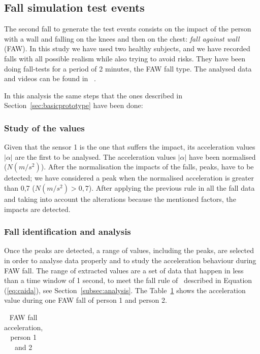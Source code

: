 \documentclass[review]{elsarticle}
\begin{document}
\subsection{Fall simulation test events}

The second fall to generate the test events consists on the impact of the person with 
a wall and falling on the knees and then on the chest: \textit{fall against wall} (FAW). 
In this study we have used two healthy subjects, and we have recorded falls with all 
possible realism while also trying to avoid risks. They have been doing fall-tests for a period 
of 2 minutes, the FAW fall type. The analysed data and videos can be found in ~\cite{FallRepo}.

In this analysis the same steps that the ones described in Section~\ref{sec:basicprototype} 
have been done:

\subsubsection*{Study of the values} Given that the sensor 1 is the one that suffers the 
impact, its acceleration values $|\alpha|$ are the first to be
analysed. The acceleration values $|\alpha|$ have 
been normalised ($N(m/s^2)$). After the normalisation the impacts of the falls, peaks, 
have to be detected; we have considered a peak when the normalised acceleration is 
greater than 0,7 ($N(m/s^2) > 0,7$). After applying the previous rule in all the fall data 
and taking into account the alterations because the mentioned factors, the impacts are detected.

\subsubsection*{Fall identification and analysis} Once the peaks are detected, a range of values, 
including the peaks, are selected in order to analyse data properly and to study the acceleration 
behaviour during FAW fall. The range of extracted values are a set of data that happen in less 
than a time window of 1 second, to meet the fall rule of~\cite{Luder2009} described in 
Equation (\ref{eq:caida}), see Section~\ref{subsec:analysis}. The Table~\ref{tabla:FAW} shows the 
acceleration value during one FAW fall of person 1 and person 2. 

\begin{table}[!ht]
 \centering
 \begin{tabular}{*{5}{r}}
   
 \end{tabular}
 \caption{FAW fall acceleration, person 1 and 2}%
 \label{tabla:FAW}
\end{table}
\end{document}
